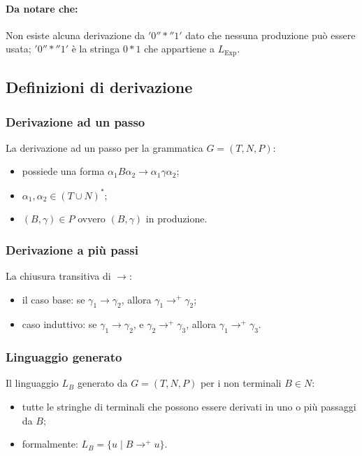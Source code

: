 \paragraph{Da notare che:}
Non esiste alcuna derivazione da $'0''*''1'$ dato che nessuna produzione può
essere usata; $'0''*''1'$ è la stringa $0*1$ che appartiene a $L_{\text{Exp}}$.

\subsection{Definizioni di derivazione}
\subsubsection{Derivazione ad un passo}
\begin{theorem}
  La derivazione ad un passo per la grammatica $G=(T,N,P)$:
  \begin{itemize}
    \item possiede una forma $\alpha_1 B\alpha_2\rightarrow\alpha_1\gamma
      \alpha_2$;
    \item $\alpha_1,\alpha_2\in(T\cup N)^*$;
    \item $(B,\gamma)\in P$ ovvero $(B,\gamma)$ in produzione.
  \end{itemize}
\end{theorem}

\subsubsection{Derivazione a più passi}
\begin{theorem}
  La chiusura transitiva di $\rightarrow$:
  \begin{itemize}
    \item il caso base: se $\gamma_1\rightarrow\gamma_2$, allora $\gamma_1
      \rightarrow^+\gamma_2$;
    \item caso induttivo: se $\gamma_1\rightarrow\gamma_2$, e $\gamma_2
      \rightarrow^+\gamma_3$, allora $\gamma_1\rightarrow^+\gamma_3$.
  \end{itemize}
\end{theorem}

\subsubsection{Linguaggio generato}
Il linguaggio $L_B$ generato da $G=(T,N,P)$ per i non terminali $B\in N$:
\begin{itemize}
  \item tutte le stringhe di terminali che possono essere derivati in uno
    o più passaggi da $B$;
  \item formalmente: $L_B=\{u\mid B\rightarrow^+ u\}$.
\end{itemize}

